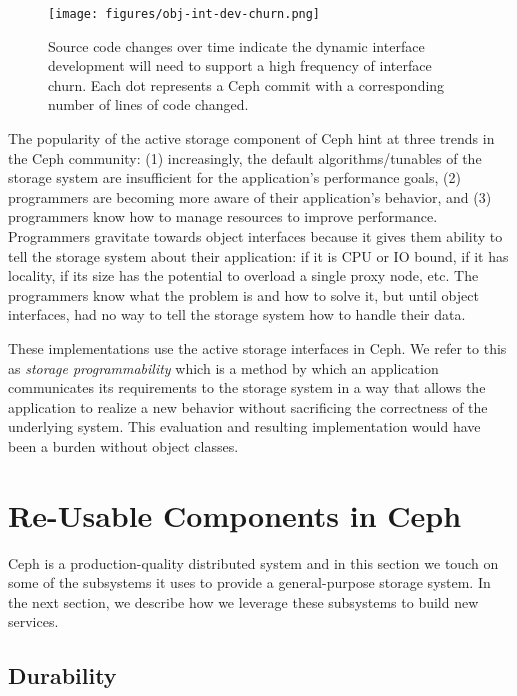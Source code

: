 \documentclass[10pt,twocolumn]{article}
\begin{document}
\begin{figure}[htbp]
\centering
\texttt{[image: figures/obj-int-dev-churn.png]}
\caption{Source code changes over time indicate the dynamic interface
development will need to support a high frequency of interface churn.
Each dot represents a Ceph commit with a corresponding number of lines
of code changed. \label{fig:obj-int-dev-churn}}
\end{figure}

The popularity of the active storage component of Ceph hint at three
trends in the Ceph community: (1) increasingly, the default
algorithms/tunables of the storage system are insufficient for the
application's performance goals, (2) programmers are becoming more aware
of their application's behavior, and (3) programmers know how to manage
resources to improve performance. Programmers gravitate towards object
interfaces because it gives them ability to tell the storage system
about their application: if it is CPU or IO bound, if it has locality,
if its size has the potential to overload a single proxy node, etc. The
programmers know what the problem is and how to solve it, but until
object interfaces, had no way to tell the storage system how to handle
their data.

These implementations use the active storage interfaces in Ceph. We
refer to this as \emph{storage programmability} which is a method by
which an application communicates its requirements to the storage system
in a way that allows the application to realize a new behavior without
sacrificing the correctness of the underlying system. This evaluation
and resulting implementation would have been a burden without object
classes.

\section{Re-Usable Components in
Ceph}\label{re-usable-components-in-ceph}

\label{background}

Ceph is a production-quality distributed system and in this section we
touch on some of the subsystems it uses to provide a general-purpose
storage system. In the next section, we describe how we leverage these
subsystems to build new services.

\subsection{Durability}\label{durability}
\end{document}
